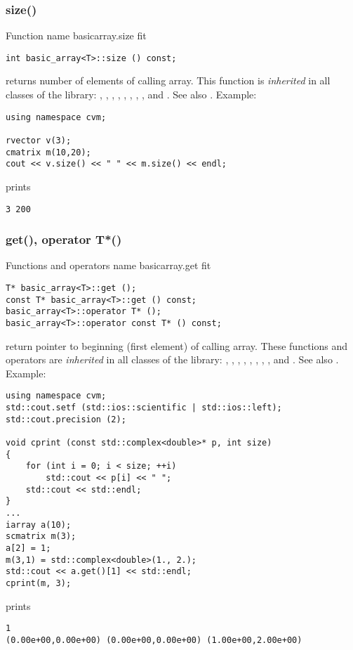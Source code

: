 \subsubsection{size()}
Function%
\pdfdest name {basicarray.size} fit
\begin{verbatim}
int basic_array<T>::size () const;
\end{verbatim}
returns  number of elements of calling array.
This function is \emph{inherited} in all classes of the library:
,   ,
,   ,
, ,
, ,
 and .
See also .
Example:
\begin{Verbatim}
using namespace cvm;

rvector v(3);
cmatrix m(10,20);
cout << v.size() << " " << m.size() << endl;
\end{Verbatim}
prints
\begin{Verbatim}
3 200
\end{Verbatim}
\newpage


\subsubsection{get(), operator T*()}
Functions and operators%
\pdfdest name {basicarray.get} fit
\begin{verbatim}
T* basic_array<T>::get ();
const T* basic_array<T>::get () const;
basic_array<T>::operator T* ();
basic_array<T>::operator const T* () const;
\end{verbatim}
return  pointer to beginning (first element) of calling array.
These functions and operators are \emph{inherited} in all 
classes of the library:
,   ,
,   ,
, ,
, ,
 and .
See also .
Example:
\begin{Verbatim}
using namespace cvm;
std::cout.setf (std::ios::scientific | std::ios::left); 
std::cout.precision (2);

void cprint (const std::complex<double>* p, int size)
{
    for (int i = 0; i < size; ++i)
        std::cout << p[i] << " ";
    std::cout << std::endl;
}
...
iarray a(10);
scmatrix m(3);
a[2] = 1;
m(3,1) = std::complex<double>(1., 2.);
std::cout << a.get()[1] << std::endl;
cprint(m, 3);
\end{Verbatim}
prints
\begin{Verbatim}
1
(0.00e+00,0.00e+00) (0.00e+00,0.00e+00) (1.00e+00,2.00e+00)
\end{Verbatim}
\newpage


